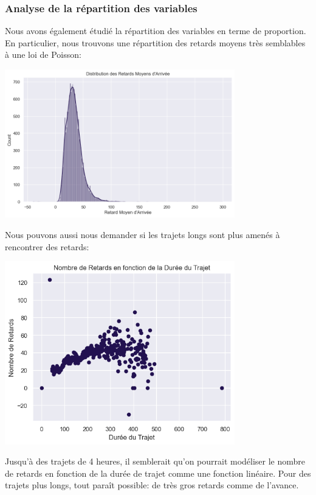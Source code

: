 \documentclass{article}
\begin{document}
\subsubsection{Analyse de la répartition des variables}
Nous avons également étudié la répartition des variables en terme de proportion. En particulier, nous trouvons une répartition des retards moyens très semblables à une loi de Poisson: 
\begin{center}
\includegraphics[width=10cm]{dist_retard_arrivee.png}
\end{center}

Nous pouvons aussi nous demander si les trajets longs sont plus amenés à rencontrer des retards:

\begin{center}
\includegraphics[width=10cm]{retard_ftn_duree.png}
\end{center}

Jusqu'à des trajets de 4 heures, il semblerait qu'on pourrait modéliser le nombre de retards en fonction de la durée de trajet comme une fonction linéaire. Pour des trajets plus longs, tout paraît possible: de très gros retards comme de l'avance. 
\end{document}
